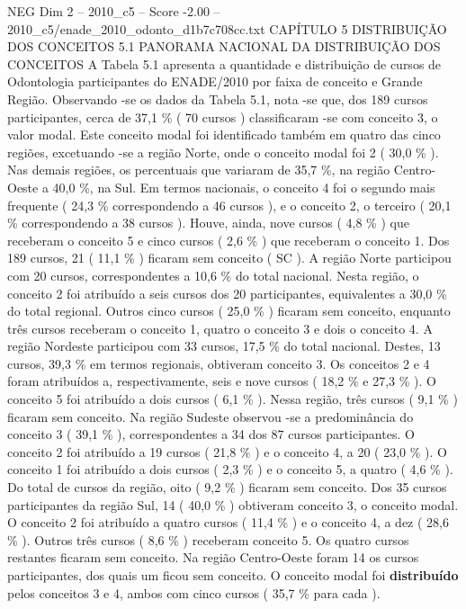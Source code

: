\begin{textsample}{NEG Dim 2 – 2010\_c5 – Score -2.00 – 2010\_c5/enade\_2010\_odonto\_d1b7c708cc.txt}  \label{ex:f2_neg_105}
CAPÍTULO 5 DISTRIBUIÇÃO DOS CONCEITOS 5.1 PANORAMA NACIONAL DA DISTRIBUIÇÃO DOS CONCEITOS A Tabela 5.1 apresenta a quantidade e distribuição de cursos de Odontologia participantes do ENADE/2010 por faixa de conceito e Grande Região.
Observando -se os dados da Tabela 5.1, nota -se que, dos 189 cursos participantes, cerca de 37,1 \% ( 70 cursos ) classificaram -se com conceito 3, o valor modal.
Este conceito modal foi identificado também em quatro das cinco regiões, excetuando -se a região Norte, onde o conceito modal foi 2 ( 30,0 \% ).
Nas demais regiões, os percentuais que variaram de 35,7 \%, na região Centro-Oeste a 40,0 \%, na Sul.
Em termos nacionais, o conceito 4 foi o segundo mais frequente ( 24,3 \% correspondendo a 46 cursos ), e o conceito 2, o terceiro ( 20,1 \% correspondendo a 38 cursos ).
Houve, ainda, nove cursos ( 4,8 \% ) que receberam o conceito 5 e cinco cursos ( 2,6 \% ) que receberam o conceito 1.
Dos 189 cursos, 21 ( 11,1 \% ) ficaram sem conceito ( SC ).
A região Norte participou com 20 cursos, correspondentes a 10,6 \% do total nacional.
Nesta região, o conceito 2 foi atribuído a seis cursos dos 20 participantes, equivalentes a 30,0 \% do total regional.
Outros cinco cursos ( 25,0 \% ) ficaram sem conceito, enquanto três cursos receberam o conceito 1, quatro o conceito 3 e dois o conceito 4.
A região Nordeste participou com 33 cursos, 17,5 \% do total nacional.
Destes, 13 cursos, 39,3 \% em termos regionais, obtiveram conceito 3.
Os conceitos 2 e 4 foram atribuídos a, respectivamente, seis e nove cursos ( 18,2 \% e 27,3 \% ).
O conceito 5 foi atribuído a dois cursos ( 6,1 \% ).
Nessa região, três cursos ( 9,1 \% ) ficaram sem conceito.
Na região Sudeste observou -se a predominância do conceito 3 ( 39,1 \% ), correspondentes a 34 dos 87 cursos participantes.
O conceito 2 foi atribuído a 19 cursos ( 21,8 \% ) e o conceito 4, a 20 ( 23,0 \% ).
O conceito 1 foi atribuído a dois cursos ( 2,3 \% ) e o conceito 5, a quatro ( 4,6 \% ).
Do total de cursos da região, oito ( 9,2 \% ) ficaram sem conceito.
Dos 35 cursos participantes da região Sul, 14 ( 40,0 \% ) obtiveram conceito 3, o conceito modal.
O conceito 2 foi atribuído a quatro cursos ( 11,4 \% ) e o conceito 4, a dez ( 28,6 \% ).
Outros três cursos ( 8,6 \% ) receberam conceito 5.
Os quatro cursos restantes ficaram sem conceito.
Na região Centro-Oeste foram 14 os cursos participantes, dos quais um ficou sem conceito.
O conceito modal foi \textbf{distribuído} pelos conceitos 3 e 4, ambos com cinco cursos ( 35,7 \% para cada ).

\end{textsample}
